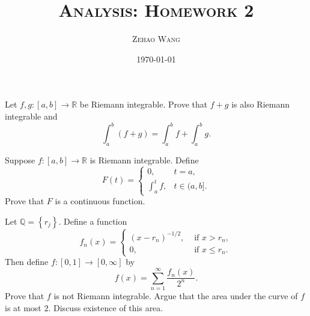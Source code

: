 \documentclass[en, normal, 11pt, black]{elegantnote}
\title{\textsc{Analysis: Homework 2}}
\author{\textsc{Zehao Wang}}
\date{\today}
\newenvironment{exercise}[1]{\begin{tcolorbox}[colback=black!15, colframe=black!80, breakable, title=#1]}{\end{tcolorbox}}
\begin{document}
\maketitle

\begin{exercise}{(1), }
    Let $f, g:[a, b] \rightarrow \mathbb{R}$ be Riemann integrable. Prove that $f+g$ is also Riemann integrable and
    \[
        \int_{a}^{b}(f+g)=\int_{a}^{b} f+\int_{a}^{b} g. 
    \]
\end{exercise}

\begin{exercise}{(2), }
    Suppose $f:[a, b] \rightarrow \mathbb{R}$ is Riemann integrable. Define 
    \[
        F(t)= \begin{cases}0, & t=a, \\ \int_{a}^{t} f, & t \in(a, b]. \end{cases}
    \]
    Prove that $F$ is a continuous function. 
\end{exercise}

\begin{exercise}{(3), }
    Let $\mathbb{Q}=\left\{r_{j}\right\} .$ Define a function 
    \[
        f_{n}(x)= \begin{cases}\left(x-r_{n}\right)^{-1 / 2}, & \text { if } x>r_{n}, \\ 0, & \text { if } x \leq r_{n}. \end{cases}
    \]
    Then define $f:[0,1] \rightarrow[0, \infty]$ by
    \[
        f(x)=\sum_{n=1}^{\infty} \frac{f_{n}(x)}{2^{n}}. 
    \]
    Prove that $f$ is not Riemann integrable. Argue that the area under the curve of $f$ is at most $2 .$ Discuss existence of this area.
\end{exercise}
\end{document}

